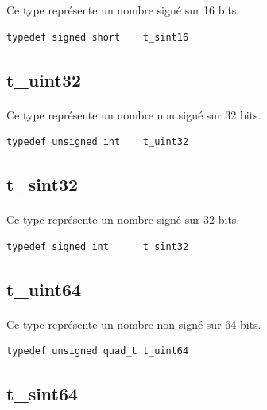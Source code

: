 \documentclass[10pt,a4wide]{article}
\begin{document}
Ce type repr\'esente un nombre sign\'e sur 16 bits.

\begin{verbatim}
typedef signed short    t_sint16
\end{verbatim}

\subsection{t\_uint32}

\paragraph{}

Ce type repr\'esente un nombre non sign\'e sur 32 bits.

\begin{verbatim}
typedef unsigned int    t_uint32
\end{verbatim}

\subsection{t\_sint32}

\paragraph{}

Ce type repr\'esente un nombre sign\'e sur 32 bits.

\begin{verbatim}
typedef signed int      t_sint32
\end{verbatim}

\subsection{t\_uint64}

\paragraph{}

Ce type repr\'esente un nombre non sign\'e sur 64 bits.

\begin{verbatim}
typedef unsigned quad_t t_uint64
\end{verbatim}

\subsection{t\_sint64}
\end{document}
